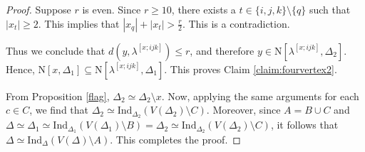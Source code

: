 \documentclass{amsart}
\theoremstyle{definition}
\theoremstyle{remark}
\numberwithin{equation}{section}
\newcommand{\D}{\Delta}
\def\n{{\mathrm{N}}}
\begin{document}
\begin{proof}
	Suppose $r$ is even. Since $r\geq 10$, there exists a $t\in\{i,j,k\}\setminus \{q\}$ such that $|x_t|\geq 2$. This implies that $|x_q|+|x_t|>\frac{r}{2}$. This is a contradiction.
		
	Thus we conclude that $d(y, \lambda^{[x;ijk]}) \leq r$, and therefore $y \in \n[\lambda^{[x;ijk]}, \D_2]$. 
	Hence, $\n[x,\D_1]\subseteq \n[\lambda^{[x;ijk]},\D_1]$. This proves Claim \ref{claim:fourvertex2}.  
	
	
	From Proposition \ref{flag}, $\D_2\simeq \D_2 \setminus x$. Now, applying the same arguments for each $c\in C$, we find that $\D_2\simeq \mathrm{Ind}_{\D_2}(V(\D_2)\setminus C)$. Moreover, since $A=B\cup C$ and $\D\simeq \D_1\simeq \mathrm{Ind}_{\D_1}(V(\D_1)\setminus B)= \D_2\simeq \mathrm{Ind}_{\D_2}(V(\D_2)\setminus C)$, it follows that $\D\simeq \mathrm{Ind}_{\D}(V(\D)\setminus A)$. This completes the proof.
\end{proof}
\end{document}
